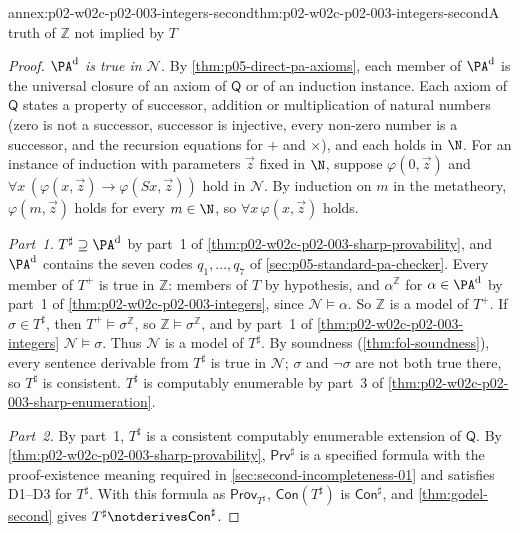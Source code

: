 \begin{annexitem}{annex:p02-w02c-p02-003-integers-second}{thm:p02-w02c-p02-003-integers-second}{A truth of \(\mathbb Z\) not implied by \(T\)}
\begin{proof}
\emph{\(\PA^{\rm d}\) is true in \(\mathcal N\).}  By
\cref{thm:p05-direct-pa-axioms}, each member of \(\PA^{\rm d}\) is the
universal closure of an axiom of \(\mathsf Q\) or of an induction instance.
Each axiom of \(\mathsf Q\) states a property of successor, addition or
multiplication of natural numbers (zero is not a successor, successor is
injective, every non-zero number is a successor, and the recursion
equations for \(+\) and \(\times\)), and each holds in \(\N\).  For an
instance of induction with parameters \(\vec z\) fixed in \(\N\), suppose
\(\varphi(0,\vec z)\) and \(\forall x\,(\varphi(x,\vec z)\to
\varphi(Sx,\vec z))\) hold in \(\mathcal N\).  By induction on \(m\) in the
metatheory, \(\varphi(m,\vec z)\) holds for every \(m\in\N\), so
\(\forall x\,\varphi(x,\vec z)\) holds.

\emph{Part~1.}  \(T^{\sharp}\supseteq\PA^{\rm d}\) by part~1 of
\cref{thm:p02-w02c-p02-003-sharp-provability}, and \(\PA^{\rm d}\) contains
the seven codes \(q_1,\ldots,q_7\) of \cref{sec:p05-standard-pa-checker}.
Every member of \(T^{+}\) is true in \(\mathbb Z\): members of \(T\) by
hypothesis, and \(\alpha^{\mathbb Z}\) for \(\alpha\in\PA^{\rm d}\) by
part~1 of \cref{thm:p02-w02c-p02-003-integers}, since
\(\mathcal N\models\alpha\).  So \(\mathbb Z\) is a model of \(T^{+}\).  If
\(\sigma\in T^{\sharp}\), then \(T^{+}\models\sigma^{\mathbb Z}\), so
\(\mathbb Z\models\sigma^{\mathbb Z}\), and by part~1 of
\cref{thm:p02-w02c-p02-003-integers} \(\mathcal N\models\sigma\).  Thus
\(\mathcal N\) is a model of \(T^{\sharp}\).  By soundness
(\cref{thm:fol-soundness}), every sentence derivable from \(T^{\sharp}\) is
true in \(\mathcal N\); \(\sigma\) and \(\neg\sigma\) are not both true
there, so \(T^{\sharp}\) is consistent.  \(T^{\sharp}\) is computably
enumerable by part~3 of \cref{thm:p02-w02c-p02-003-sharp-enumeration}.

\emph{Part~2.}  By part~1, \(T^{\sharp}\) is a consistent computably
enumerable extension of \(\mathsf Q\).  By
\cref{thm:p02-w02c-p02-003-sharp-provability}, \(\mathsf{Prv}^{\sharp}\) is
a specified formula with the proof-existence meaning required in
\cref{sec:second-incompleteness-01} and satisfies D1--D3 for \(T^{\sharp}\).
With this formula as \(\mathsf{Prov}_{T^{\sharp}}\), \(\mathsf{Con}(T^{\sharp})\)
is \(\mathsf{Con}^{\sharp}\), and \cref{thm:godel-second} gives
\(T^{\sharp}\notderives\mathsf{Con}^{\sharp}\).


\end{proof}
\end{annexitem}
